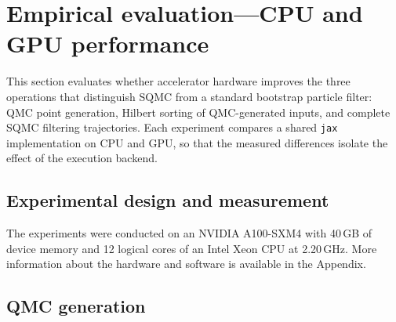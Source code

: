 %

\section{Empirical evaluation---CPU and GPU performance}
\label{sec:empirical-cpu-gpu}
This section evaluates whether accelerator hardware improves the three operations that distinguish SQMC from a standard bootstrap particle filter: QMC point generation, Hilbert sorting of QMC-generated inputs, and complete SQMC filtering trajectories. Each experiment compares a shared \texttt{jax} implementation on CPU and GPU, so that the measured differences isolate the effect of the execution backend.

\subsection{Experimental design and measurement}
\label{sec:empirical-design}

The experiments were conducted on an NVIDIA A100-SXM4 with 40\,GB of device memory and 12 logical cores of an Intel Xeon CPU at 2.20\,GHz. More information about the hardware and software is available in the Appendix.

\subsection{QMC generation}
\label{sec:qmc-benchmark}

